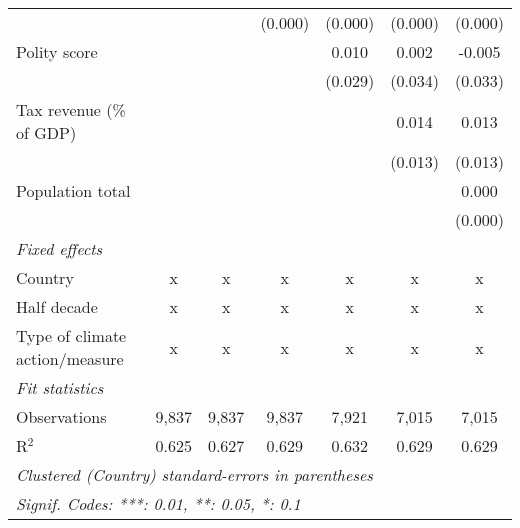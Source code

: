 \begin{tabular}{lcccccc}
                                                                                                   &         &               & (0.000)        & (0.000)        & (0.000)        & (0.000)\\   
   Polity score                                                                                    &         &               &                & 0.010          & 0.002          & -0.005\\   
                                                                                                   &         &               &                & (0.029)        & (0.034)        & (0.033)\\   
   Tax revenue (\% of GDP)                                                                         &         &               &                &                & 0.014          & 0.013\\   
                                                                                                   &         &               &                &                & (0.013)        & (0.013)\\   
   Population total                                                                                &         &               &                &                &                & 0.000\\   
                                                                                                   &         &               &                &                &                & (0.000)\\   
   \emph{Fixed effects}\\
   Country                                                                                         & x       & x             & x              & x              & x              & x\\  
   Half decade                                                                                     & x       & x             & x              & x              & x              & x\\  
   Type of climate action/measure                                                                  & x       & x             & x              & x              & x              & x\\  
   \midrule \emph{Fit statistics}\\
   Observations                                                                                    & 9,837   & 9,837         & 9,837          & 7,921          & 7,015          & 7,015\\  
   R$^2$                                                                                           & 0.625   & 0.627         & 0.629          & 0.632          & 0.629          & 0.629\\  
   \midrule
   \multicolumn{7}{l}{\emph{Clustered (Country) standard-errors in parentheses}}\\
   \multicolumn{7}{l}{\emph{Signif. Codes: ***: 0.01, **: 0.05, *: 0.1}}\\
\end{tabular}
\par\endgroup


